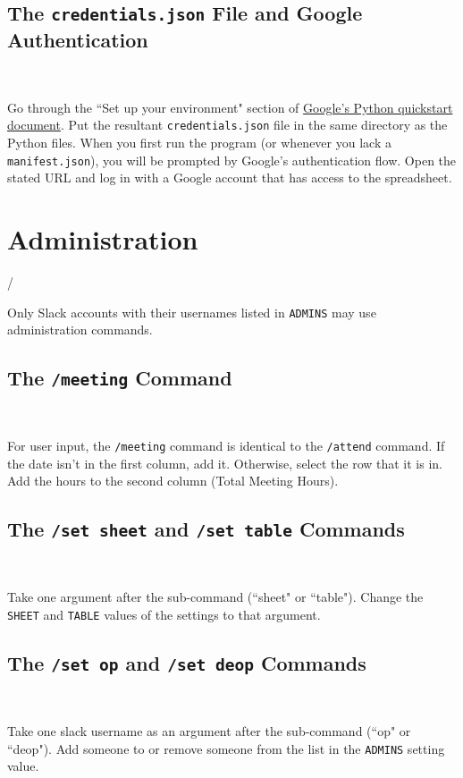 \documentclass{article}
\begin{document}
\subsection{The \texttt{credentials.json} File and Google Authentication}

\

Go through the ``Set up your environment" section of \href{https://developers.google.com/sheets/api/quickstart/python#set-up-environment}{Google's Python quickstart document}. Put the resultant \texttt{credentials.json} file in the same directory as the Python files. When you first run the program (or whenever you lack a \texttt{manifest.json}), you will be prompted by Google's authentication flow. Open the stated URL and log in with a Google account that has access to the spreadsheet.

\section{Administration}

/

Only Slack accounts with their usernames listed in \texttt{ADMINS} may use administration commands.

\subsection{The \texttt{/meeting} Command}

\

For user input, the \texttt{/meeting} command is identical to the \texttt{/attend} command. If the date isn't in the first column, add it. Otherwise, select the row that it is in. Add the hours to the second column (Total Meeting Hours).

\subsection{The \texttt{/set sheet} and \texttt{/set table} Commands}

\

Take one argument after the sub-command (``sheet" or ``table"). Change the \texttt{SHEET} and \texttt{TABLE} values of the settings to that argument.

\subsection{The \texttt{/set op} and \texttt{/set deop} Commands}

\

Take one slack username as an argument after the sub-command (``op" or ``deop"). Add someone to or remove someone from the list in the \texttt{ADMINS} setting value.
\end{document}
